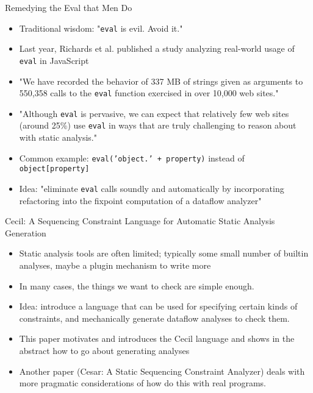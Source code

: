 \documentclass{beamer}
\begin{document}
\begin{frame}{Remedying the Eval that Men Do}
\begin{itemize}
\item Traditional wisdom: "{\tt eval} is evil. Avoid it."
\item Last year, Richards et al. published a study analyzing real-world 
usage of {\tt eval} in JavaScript
\item "We have recorded the behavior of 337 MB of strings given as
arguments to 550,358 calls to the {\tt eval} function exercised in over
10,000 web sites."
\item "Although {\tt eval} is pervasive, we can expect that relatively few
web sites (around 25\%) use {\tt eval} in ways that are truly challenging to
reason about with static analysis."
\item Common example: {\tt eval('object.' + property)} instead of {\tt object[property]} 
\item Idea: "eliminate {\tt eval} calls soundly and automatically by
incorporating refactoring into the fixpoint computation of a dataflow
analyzer"
\end{itemize}
\end{frame}

\begin{frame}{Cecil: A Sequencing Constraint Language for Automatic Static Analysis Generation}
\begin{itemize}
\item Static analysis tools are often limited; typically some small number
of builtin analyses, maybe a plugin mechanism to write more
\item In many cases, the things we want to check are simple enough.
\item Idea: introduce a language that can be used for specifying certain
kinds of constraints, and mechanically generate dataflow analyses to check
them.
\item This paper motivates and introduces the Cecil language and shows in
the abstract how to go about generating analyses
\item Another paper (Cesar: A Static Sequencing Constraint Analyzer) deals
with more pragmatic considerations of how do this with real programs.
\end{itemize}
\end{frame}
\end{document}
